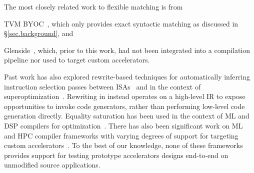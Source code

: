 The most closely related work to flexible matching is from 
\begin{inlinelist}
  \item TVM BYOC~\cite{chen2021byoc}, which only provides exact syntactic matching as discussed in \S\ref{sec.background}, and
  \item Glenside~\cite{smith2021pure}, which, prior to this work, had not been integrated into a compilation pipeline nor used to target custom accelerators.
\end{inlinelist}
Past work has also explored rewrite-based techniques for
  automatically inferring instruction selection passes
  between ISAs~\cite{
    ramsey2011resourceable,
    dias2010automatically}
  and in the context of superoptimization~\cite{
    bonsal-so,
    bonsal-so-translate}.
Rewriting in \TLA instead operates on a high-level IR
  to expose opportunities to invoke code generators,
  rather than performing low-level code generation directly.
Equality saturation has been
  used in the context of
  ML and DSP compilers for
  optimization~\cite{
    yang2021equality,
    alexa-dsp-eqsat,
    caviar-cc22}.
There has also been significant work on
  ML and HPC compiler frameworks with
  varying degrees of support for
  targeting custom accelerators~\cite{
    ragan2013halide,
    AtlPopl22,
    chen2018tvm,
    moreau2019hardware,
    lattner2021mlir}.
To the best of our knowledge,
  none of these frameworks provides support for
  testing prototype accelerators
  designs end-to-end on
  unmodified source applications.
  



